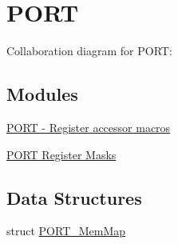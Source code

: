 \hypertarget{group___p_o_r_t___peripheral}{}\section{P\+O\+RT}
\label{group___p_o_r_t___peripheral}
Collaboration diagram for P\+O\+RT\+:
\subsection*{Modules}
\begin{DoxyCompactItemize}
\item 
\hyperlink{group___p_o_r_t___register___accessor___macros}{P\+O\+R\+T -\/ Register accessor macros}
\item 
\hyperlink{group___p_o_r_t___register___masks}{P\+O\+R\+T Register Masks}
\end{DoxyCompactItemize}
\subsection*{Data Structures}
\begin{DoxyCompactItemize}
\item 
struct \hyperlink{struct_p_o_r_t___mem_map}{P\+O\+R\+T\+\_\+\+Mem\+Map}
\end{DoxyCompactItemize}
